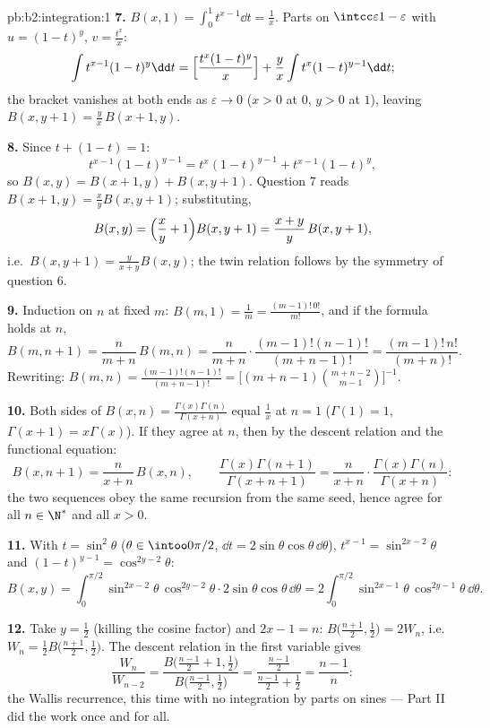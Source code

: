 \begin{solution}{pb:b2:integration:1}
\textbf{7.} $B(x,1) = \int_0^1 t^{x-1}\dd t = \frac1x$. Parts
on $\intcc\varepsilon{1-\varepsilon}$ with $u = (1-t)^y$, $v =
\frac{t^x}{x}$:
\[
\int t^{x-1}(1-t)^{y}\dd t
= \Bigl[\frac{t^x(1-t)^y}{x}\Bigr]
+ \frac{y}{x}\int t^{x}(1-t)^{y-1}\dd t ;
\]
the bracket vanishes at both ends as $\varepsilon \to 0$ ($x >
0$ at $0$, $y > 0$ at $1$), leaving $B(x, y+1) = \frac
yx\,B(x+1, y)$.

\textbf{8.} Since $t + (1-t) = 1$:
\[
t^{x-1}(1-t)^{y-1} = t^{x}(1-t)^{y-1} + t^{x-1}(1-t)^{y},
\]
so $B(x,y) = B(x+1,y) + B(x,y+1)$. Question 7 reads $B(x+1,y) =
\frac xy B(x,y+1)$; substituting,
\[
B(x,y) = \Bigl(\frac xy + 1\Bigr)B(x,y+1)
= \frac{x+y}{y}\,B(x,y+1),
\]
i.e.\ $B(x,y+1) = \frac{y}{x+y}B(x,y)$; the twin relation
follows by the symmetry of question 6.

\textbf{9.} Induction on $n$ at fixed $m$: $B(m,1) = \frac1m =
\frac{(m-1)!\,0!}{m!}$, and if the formula holds at $n$,
\[
B(m, n+1) = \frac{n}{m+n}\,B(m,n)
= \frac{n}{m+n}\cdot\frac{(m-1)!(n-1)!}{(m+n-1)!}
= \frac{(m-1)!\,n!}{(m+n)!} .
\]
Rewriting: $B(m,n) = \frac{(m-1)!(n-1)!}{(m+n-1)!} =
\bigl[(m+n-1)\binom{m+n-2}{m-1}\bigr]^{-1}$.

\textbf{10.} Both sides of $B(x,n) =
\frac{\Gamma(x)\Gamma(n)}{\Gamma(x+n)}$ equal $\frac1x$ at $n =
1$ ($\Gamma(1) = 1$, $\Gamma(x+1) = x\Gamma(x)$). If they agree
at $n$, then by the descent relation and the functional
equation:
\[
B(x, n+1) = \frac{n}{x+n}\,B(x,n), \qquad
\frac{\Gamma(x)\Gamma(n+1)}{\Gamma(x+n+1)}
= \frac{n}{x+n}\cdot
\frac{\Gamma(x)\Gamma(n)}{\Gamma(x+n)} :
\]
the two sequences obey the same recursion from the same seed,
hence agree for all $n \in \N^*$ and all $x > 0$.

\textbf{11.} With $t = \sin^2\theta$ ($\theta \in
\intoo0{\pi/2}$, $\dd t = 2\sin\theta\cos\theta\,\dd\theta$),
$t^{x-1} = \sin^{2x-2}\theta$ and $(1-t)^{y-1} =
\cos^{2y-2}\theta$:
\[
B(x,y) = \int_0^{\pi/2}\sin^{2x-2}\theta\,\cos^{2y-2}\theta
\cdot 2\sin\theta\cos\theta\,\dd\theta
= 2\int_0^{\pi/2}\sin^{2x-1}\theta\,\cos^{2y-1}\theta\,
\dd\theta .
\]

\textbf{12.} Take $y = \frac12$ (killing the cosine factor) and
$2x - 1 = n$: $B\bigl(\frac{n+1}2, \frac12\bigr) = 2W_n$, i.e.\
$W_n = \frac12 B\bigl(\frac{n+1}2,\frac12\bigr)$. The descent
relation in the first variable gives
\[
\frac{W_n}{W_{n-2}}
= \frac{B\bigl(\frac{n-1}2 + 1, \frac12\bigr)}
{B\bigl(\frac{n-1}2, \frac12\bigr)}
= \frac{\frac{n-1}2}{\frac{n-1}2 + \frac12}
= \frac{n-1}{n} :
\]
the Wallis recurrence, this time with no integration by parts
on sines --- Part II did the work once and for all.


\end{solution}
